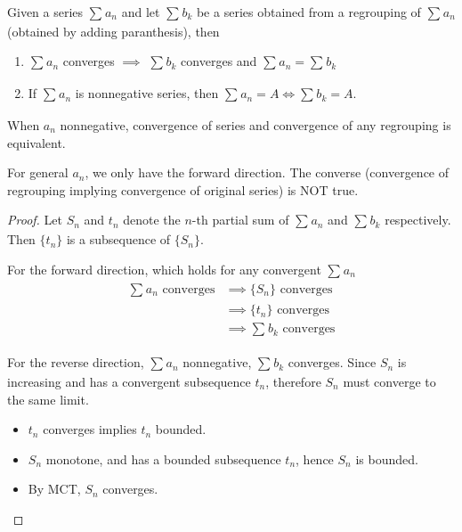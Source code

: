 \begin{theorem}
    \label{thm:nonnegative-series-2}
    Given a series $\sum\limits_{}^{} a_n$ and let $\sum\limits_{}^{} b_k$
    be a series obtained from a regrouping of $\sum\limits_{}^{} a_n$ 
    (obtained by adding paranthesis), 
    then
    \begin{enumerate}
        \item $\sum\limits_{}^{} a_n$ converges $\implies$
        $\sum\limits_{}^{} b_k$ converges and 
        $\sum\limits_{}^{} a_n = \sum\limits_{}^{} b_k$
        \item If $\sum\limits_{}^{} a_n$ is nonnegative series, 
        then $\sum\limits_{}^{} a_n = A \iff \sum\limits_{}^{} b_k = A$.
    \end{enumerate} 
\end{theorem}

\begin{remark}
    When $a_n$ nonnegative, 
    convergence of series and convergence of 
    any regrouping is equivalent.
    \medskip

    For general $a_n$, we only have the forward direction.
    The converse (convergence of regrouping implying
    convergence of original series)
    is NOT true.
\end{remark}


\begin{proof}
    Let $S_n$ and $t_n$
    denote the $n$-th partial sum of $\sum\limits_{}^{} a_n$
    and $\sum\limits_{}^{} b_k$ respectively. Then
    $\{ t_n \} $ is a subsequence of $\{ S_n \} $.
    \medskip

    For the forward direction, which holds 
    for any convergent $\sum\limits_{}^{} a_n$
    \begin{align*}
        \sum\limits_{}^{} a_n \text{ converges} 
        &\implies \{ S_n \}  \text{ converges} \\
        & \implies \{ t_n \}  \text{ converges } \\
        & \implies \sum\limits_{}^{} b_k \text{ converges}
    \end{align*}
    
    For the reverse direction, $\sum\limits_{}^{} a_n$ nonnegative,
    $\sum\limits_{}^{} b_k$ converges.
    Since $S_n$ is increasing and has a convergent subsequence
    $t_n$, therefore $S_n$ must converge to the same limit.
    \begin{itemize}
        \item $t_n$ converges implies $t_n$ bounded.
        \item $S_n$ monotone, and has a bounded subsequence $t_n$,
        hence $S_n$ is bounded.
        \item By MCT, $S_n$ converges.
    \end{itemize} 
\end{proof}

